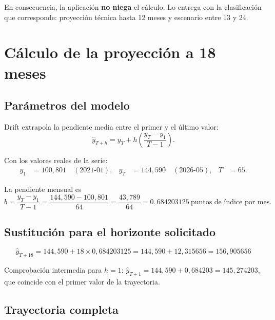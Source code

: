 \documentclass[11pt,letterpaper]{article}
\begin{document}
En consecuencia, la aplicación \textbf{no niega} el cálculo. Lo entrega con la
clasificación que corresponde: proyección técnica hasta 12 meses y escenario
entre 13 y 24.

\section{Cálculo de la proyección a 18 meses}

\subsection{Parámetros del modelo}

Drift extrapola la pendiente media entre el primer y el último valor:
\begin{equation}
\hat y_{T+h}=y_T+h\left(\frac{y_T-y_1}{T-1}\right).
\end{equation}

Con los valores reales de la serie:
\begin{align}
y_1&=100{,}801 \quad (\text{2021-01}), &
y_T&=144{,}590 \quad (\text{2026-05}), &
T&=65 .
\end{align}

La pendiente mensual es
\begin{equation}
b=\frac{y_T-y_1}{T-1}=\frac{144{,}590-100{,}801}{64}
=\frac{43{,}789}{64}=0{,}684203125\ \text{puntos de índice por mes}.
\end{equation}

\subsection{Sustitución para el horizonte solicitado}

\begin{equation}
\boxed{\;\hat y_{T+18}=144{,}590+18\times 0{,}684203125
=144{,}590+12{,}315656=156{,}905656\;}
\end{equation}

Comprobación intermedia para \(h=1\):
\(\hat y_{T+1}=144{,}590+0{,}684203=145{,}274203\), que coincide con el primer
valor de la trayectoria.

\subsection{Trayectoria completa}
\end{document}
